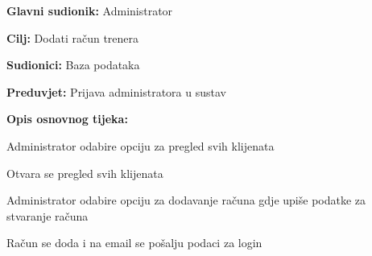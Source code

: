 				\noindent {}
				\begin{packed_item}
					
					\item \textbf{Glavni sudionik: } Administrator
					\item  \textbf{Cilj:} Dodati račun trenera
					\item  \textbf{Sudionici:} Baza podataka
					\item  \textbf{Preduvjet:}  Prijava administratora u sustav
					\item  \textbf{Opis osnovnog tijeka:}
					
					\item[] \begin{packed_enum}
						\item Administrator odabire opciju za pregled svih klijenata
						\item Otvara se pregled svih klijenata
						\item Administrator odabire opciju za dodavanje računa gdje upiše podatke za stvaranje računa
						\item Račun se doda i na email se pošalju podaci za login
					\end{packed_enum}
				\end{packed_item}
				
